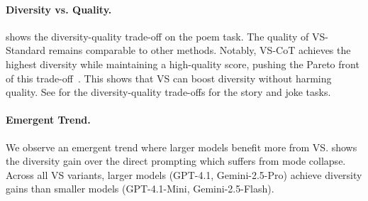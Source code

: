 \paragraph{Diversity vs. Quality.}  shows the diversity-quality trade-off on the poem task. The quality of VS-Standard remains comparable to other methods. Notably, VS-CoT achieves the highest diversity while maintaining a high-quality score, pushing the Pareto front of this trade-off~\citep {zhang-etal-2021-trading}. This shows that VS can boost diversity without harming quality. See  for the diversity-quality trade-offs for the story and joke tasks.






\paragraph{Emergent Trend.}\label{sec:emergent_behavior}
We observe an emergent trend where larger models benefit more from VS.  shows the diversity gain over the direct prompting which suffers from mode collapse. 
Across all VS variants, larger models (GPT-4.1, Gemini-2.5-Pro) achieve diversity gains  than smaller models (GPT-4.1-Mini, Gemini-2.5-Flash). %



